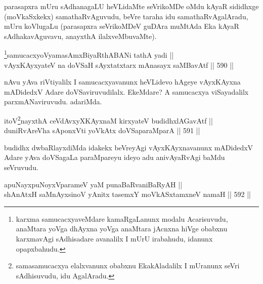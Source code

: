 \begin{artha}
parasapxra mUru sAdhanagaLU heVLidaMte seVrikoMDe oMdu kAyaR sididhxge
(moVkaSxkekx) samathaRvAguvudu, beVre taraha idu samathaRvAgalAradu,
mUru koVlugaLu (parasapxra seVrikoMDeV guDAra muMtAda Eka kAyaR
sAdhakavAguvavu, anayxthA ilalxveMbuvaMte).
\end{artha}



\begin{shl}
\footnote{karxma samucacxyaveMdare kamaRgaLanunx modalu Acarisuvudu, anaMtara yoVga dhAyxna yoVga anaMtara jAcnxna hiVge obabxnu karxmavAgi sAdhisadare avanalilx I mUrU irabahudu, idanunx opapxbahudu.}samucacxyoV\s yamasAmxBiyaRthA\s BANi tathA yadi ||  \\
vAyxKAyxyateV na doVSaH sAyxtatxtarx mAnasayx saMBavAtf \hfill || 590 ||  
\end{shl}

\begin{artha}
nAvu yAva riVtiyalilx I samucacxyavanunx heVLidevo hAgeye vAyxKAyxna mADidedxV Adare doVSaviruvudilalx. EkeMdare? A samucacxya viSayadalilx parxmANaviruvudu. adariMda.
\end{artha}



\begin{shl}
itoV\s \footnote{samasamucacxya elalxvanunx obabxnu EkakAladalilx I mUranunx
seVri sAdhisuvudu, idu AgalAradu.}nayxthA ceVdAvxyXKAyxnaM kirxyateV budidhxlAGavAtf || \\
duniRvAreVha sA\s \s ponxVti yoVkAtx doVSaparaMparA \hfill || 591 ||  
\end{shl}

\begin{artha}
budidhx dwbaRlayxdiMda idakekx beVreyAgi vAyxKAyxnavanunx mADidedxV Adare yAva doVSagaLa paraMpareyu ideyo adu anivAyaRvAgi baMdu seVruvudu.
\end{artha}


\begin{shl}
apuNayxpuNoyxVparameV yaM punaBaRvaniBaRyAH || \\
shAnAtxH saMnAyxsinoV yAnitx tasemxY moVkASxtamxneV namaH \hfill || 592 ||  
\end{shl}

